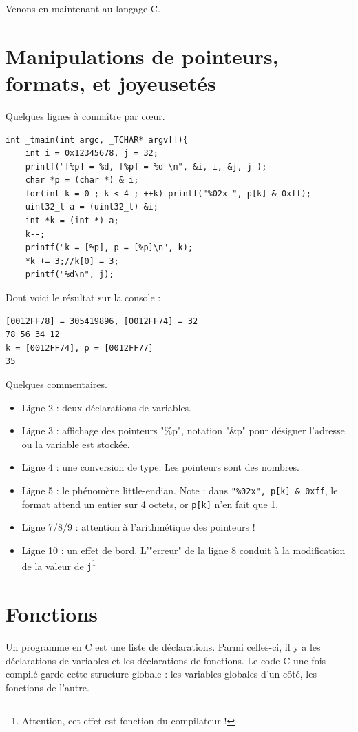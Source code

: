 \documentclass{book}
\newcommand{\code}[1]{\texttt{#1}}
\begin{document}
Venons en maintenant au langage C. 

\section{Manipulations de pointeurs, formats, et joyeusetés}

Quelques lignes à connaître par c\oe ur. 

\begin{verbatim}
int _tmain(int argc, _TCHAR* argv[]){
	int i = 0x12345678, j = 32;
	printf("[%p] = %d, [%p] = %d \n", &i, i, &j, j );
	char *p = (char *) & i;
	for(int k = 0 ; k < 4 ; ++k) printf("%02x ", p[k] & 0xff);
	uint32_t a = (uint32_t) &i;
	int *k = (int *) a;
	k--;
	printf("k = [%p], p = [%p]\n", k);
	*k += 3;//k[0] = 3;
	printf("%d\n", j);
\end{verbatim}

Dont voici le résultat sur la console : 

\begin{verbatim}
[0012FF78] = 305419896, [0012FF74] = 32
78 56 34 12 
k = [0012FF74], p = [0012FF77]
35
\end{verbatim}

Quelques commentaires. 

\begin{itemize}
	\item Ligne 2 : deux déclarations de variables.
	\item Ligne 3 : affichage des pointeurs "\%p", notation "\&p" pour désigner l'adresse ou la variable est stockée. 
	\item Ligne 4 : une conversion de type. Les pointeurs sont des nombres. 
	\item Ligne 5 : le phénomène little-endian. Note : dans \code{"\%02x", p[k] \& 0xff}, le format attend un entier sur 4 octets, or \code{p[k]} n'en fait que 1.
	\item Ligne 7/8/9 : attention à l'arithmétique des pointeurs !
	\item Ligne 10 : un effet de bord. L'"erreur" de la ligne 8 conduit à la modification de la valeur de \code{j}\footnote{Attention, cet effet est fonction du compilateur !}
\end{itemize}

\section{Fonctions}

Un programme en C est une liste de déclarations. Parmi celles-ci, il y a les déclarations de variables et les déclarations de fonctions. Le code C une fois compilé garde cette structure globale : les variables globales d'un côté, les fonctions de l'autre. 
\end{document}
